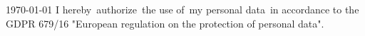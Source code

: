 \documentclass[11pt, a4paper]{awesome-cv}
\begin{document}
\makecvheader


\makecvfooter
    {\today}
    {}
    {\tiny{I hereby authorize the use of my personal data in accordance to the GDPR 679/16 "European regulation on the protection of personal data".}}






%
%
%
%
%


\end{document}
